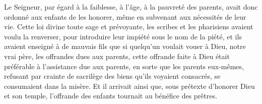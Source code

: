 Le Seigneur, par égard à la faiblesse, à l’âge, à la pauvreté des parents,
	avait donc ordonné aux enfants de les honorer,
	même en subvenant aux nécessités de leur vie.
Cette loi divine toute sage et prévoyante,
	les scribes et les pharisiens avaient voulu la renverser,
	pour introduire leur impiété sous le nom de la piété,
	et ils avaient enseigné à de mauvais fils
	que si quelqu’un voulait vouer à Dieu, notre vrai père,
		les offrandes dues aux parents,
	cette offrande faite à Dieu était préférable à l’assistance due aux parents,
	en sorte que les parents eux-mêmes,
	refusant par crainte de sacrilège des biens qu’ils voyaient consacrés,
	se consumaient dans la misère.
Et il arrivait ainsi que, sous prétexte d’honorer Dieu et son temple,
	l’offrande des enfants tournait au bénéfice des prêtres.

